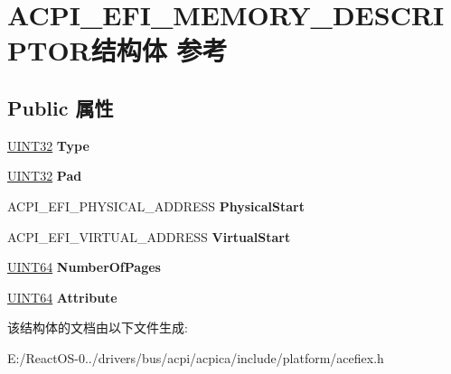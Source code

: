 \hypertarget{struct_a_c_p_i___e_f_i___m_e_m_o_r_y___d_e_s_c_r_i_p_t_o_r}{}\section{A\+C\+P\+I\+\_\+\+E\+F\+I\+\_\+\+M\+E\+M\+O\+R\+Y\+\_\+\+D\+E\+S\+C\+R\+I\+P\+T\+O\+R结构体 参考}
\label{struct_a_c_p_i___e_f_i___m_e_m_o_r_y___d_e_s_c_r_i_p_t_o_r}
\subsection*{Public 属性}
\begin{DoxyCompactItemize}
\item 
\mbox{\label{struct_a_c_p_i___e_f_i___m_e_m_o_r_y___d_e_s_c_r_i_p_t_o_r_ac94c4b55354da20e29ceb677f58e49d3}} 
\hyperlink{_processor_bind_8h_ae1e6edbbc26d6fbc71a90190d0266018}{U\+I\+N\+T32} {\bfseries Type}
\item 
\mbox{\label{struct_a_c_p_i___e_f_i___m_e_m_o_r_y___d_e_s_c_r_i_p_t_o_r_ae54a56ba29fc1217704d0e795adc97c8}} 
\hyperlink{_processor_bind_8h_ae1e6edbbc26d6fbc71a90190d0266018}{U\+I\+N\+T32} {\bfseries Pad}
\item 
\mbox{\label{struct_a_c_p_i___e_f_i___m_e_m_o_r_y___d_e_s_c_r_i_p_t_o_r_a27490aa2bfeab1cb31f41998ac47714b}} 
A\+C\+P\+I\+\_\+\+E\+F\+I\+\_\+\+P\+H\+Y\+S\+I\+C\+A\+L\+\_\+\+A\+D\+D\+R\+E\+SS {\bfseries Physical\+Start}
\item 
\mbox{\label{struct_a_c_p_i___e_f_i___m_e_m_o_r_y___d_e_s_c_r_i_p_t_o_r_adf013eb80442b441c87295f9e4c7bfb9}} 
A\+C\+P\+I\+\_\+\+E\+F\+I\+\_\+\+V\+I\+R\+T\+U\+A\+L\+\_\+\+A\+D\+D\+R\+E\+SS {\bfseries Virtual\+Start}
\item 
\mbox{\label{struct_a_c_p_i___e_f_i___m_e_m_o_r_y___d_e_s_c_r_i_p_t_o_r_ac952c17cbf35f4c983a8f6cab27aa7ba}} 
\hyperlink{_processor_bind_8h_a57be03562867144161c1bfee95ca8f7c}{U\+I\+N\+T64} {\bfseries Number\+Of\+Pages}
\item 
\mbox{\label{struct_a_c_p_i___e_f_i___m_e_m_o_r_y___d_e_s_c_r_i_p_t_o_r_a81f6e9c894cd65a5f936b2debcf1c21f}} 
\hyperlink{_processor_bind_8h_a57be03562867144161c1bfee95ca8f7c}{U\+I\+N\+T64} {\bfseries Attribute}
\end{DoxyCompactItemize}


该结构体的文档由以下文件生成\+:\begin{DoxyCompactItemize}
\item 
E\+:/\+React\+O\+S-\/0../drivers/bus/acpi/acpica/include/platform/acefiex.\+h\end{DoxyCompactItemize}
